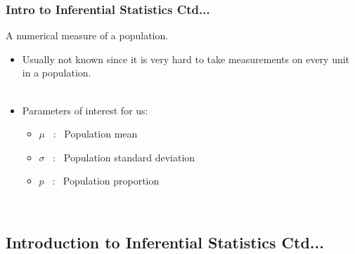 \documentclass[xcolor=svgnames, compress]{beamer}
\begin{document}
\begin{frame}
\frametitle{Intro to Inferential Statistics Ctd...} 

\vspace{-0.25cm}

\begin{definition}[Parameter]
A numerical measure of a population.
\end{definition}

\begin{itemize}\justifying
\item	Usually \alert{not known} since it is very hard to take measurements on every unit in a population.\\
\hfill\\
\item	Parameters of interest for us:
	\begin{itemize}\justifying
	\item	$\mu$	~:~ Population mean
	\item	$\sigma$	~:~  Population standard deviation
	\item	$p$		~:~  Population proportion
	\end{itemize}
\end{itemize}

\hfill\\


\end{frame}





\subsection*{Introduction to Inferential Statistics Ctd...}
\end{document}

